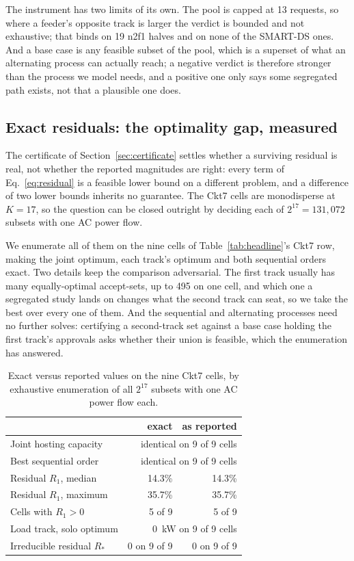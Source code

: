 \documentclass[review,authoryear,12pt]{elsarticle}
\begin{document}
The instrument has two limits of its own. The pool is capped at 13 requests, so
where a feeder's opposite track is larger the verdict is bounded and not
exhaustive; that binds on 19 n2f1 halves and on none of the SMART-DS ones.
And a base case is any feasible subset of the pool, which is a superset of what
an alternating process can actually reach; a negative verdict is therefore
stronger than the process we model needs, and a positive one only says some
segregated path exists, not that a plausible one does.

\subsection{Exact residuals: the optimality gap, measured}
\label{sec:exact}

The certificate of Section~\ref{sec:certificate} settles whether a surviving
residual is real, not whether the reported magnitudes are right: every term of
Eq.~\eqref{eq:residual} is a feasible lower bound on a different problem, and a
difference of two lower bounds inherits no guarantee. The Ckt7 cells are
monodisperse at $K=17$, so the question can be closed outright by deciding
each of $2^{17} = 131{,}072$ subsets with one AC power flow.

We enumerate all of them on the nine cells of Table~\ref{tab:headline}'s Ckt7
row, making the joint optimum, each track's optimum and both sequential orders
exact. Two details keep the comparison adversarial. The first track usually has
many equally-optimal accept-sets, up to 495 on one cell, and which one a
segregated study lands on changes what the second track can seat, so we take
the best over every one of them. And the sequential and alternating processes
need no further solves: certifying a second-track set against a base case
holding the first track's approvals asks whether their union is feasible, which
the enumeration has answered.

\begin{table}[htbp]
\centering
\caption{Exact versus reported values on the nine Ckt7 cells, by exhaustive
enumeration of all $2^{17}$ subsets with one AC power flow each.}
\label{tab:exact}
\small
\begin{tabular}{@{}lrr@{}}
\toprule
 & exact & as reported \\
\midrule
Joint hosting capacity & \multicolumn{2}{r}{identical on 9 of 9 cells} \\
Best sequential order & \multicolumn{2}{r}{identical on 9 of 9 cells} \\
Residual $R_{1}$, median & 14.3\% & 14.3\% \\
Residual $R_{1}$, maximum & 35.7\% & 35.7\% \\
Cells with $R_{1} > 0$ & 5 of 9 & 5 of 9 \\
Load track, solo optimum & \multicolumn{2}{r}{$0$~kW on 9 of 9 cells} \\
Irreducible residual $R_{\ast}$ & $0$ on 9 of 9 & $0$ on 9 of 9 \\
\bottomrule
\end{tabular}
\end{table}
\end{document}
